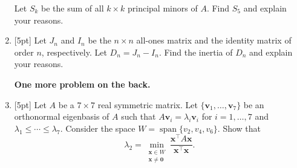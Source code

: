 \documentclass{article}
\newcommand{\trans}{^\top}
\newcommand{\bzero}{\mathbf{0}}
\newcommand{\bx}{\mathbf{x}}
\newcommand{\bv}{\mathbf{v}}
\newcommand{\vspan}{\operatorname{span}}
\begin{document}
\begin{enumerate}
\begin{figure}[h]
\begin{center}
\end{center}
\end{figure}

Let $S_k$ be the sum of all $k\times k$ principal minors of $A$.  Find $S_5$ and explain your reasons.

\item{} [5pt] Let $J_n$ and $I_n$ be the $n\times n$ all-ones matrix and the identity matrix of order $n$, respectively.  Let $D_n = J_n - I_n$.  Find the inertia of $D_n$ and explain your reasons.

\vfill

\textbf{One more problem on the back.}

\newpage
\item{} [5pt] Let $A$ be a $7\times 7$ real symmetric matrix.  Let $\{\bv_1,\ldots, \bv_7\}$ be an orthonormal eigenbasis of $A$ such that $A\bv_i = \lambda_i\bv_i$ for $i = 1, \ldots, 7$ and $\lambda_1 \leq \cdots \leq \lambda_7$.  Consider the space $W = \vspan\{v_2,v_4,v_6\}$.  Show that 
\[\lambda_2 = \min_{\substack{\bx\in W\\\bx\neq\bzero}} \frac{\bx\trans A\bx}{\bx\trans\bx}.\]
\end{enumerate}
\end{document}
